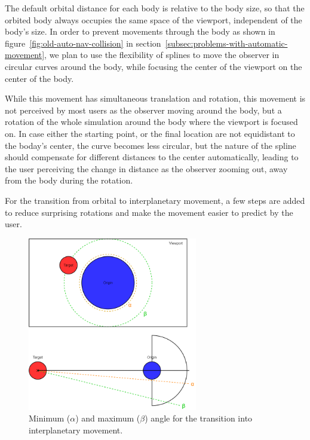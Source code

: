 The default orbital distance for each body is relative to the body size, so that the orbited body always occupies the
same space of the viewport, independent of the body's size.
In order to prevent movements through the body as shown in figure~\ref{fig:old-auto-nav-collision} in
section~\ref{subsec:problems-with-automatic-movement}, we plan to use the flexibility of splines to move the observer
in circular curves around the body, while focusing the center of the viewport on the center of the body.

While this movement has simultaneous translation and rotation, this movement is not perceived by most users as the
observer moving around the body, but a rotation of the whole simulation around the body where the viewport is focused
on.
In case either the starting point, or the final location are not equidistant to the boday's center, the curve becomes
less circular, but the nature of the spline should compensate for different distances to the center automatically,
leading to the user perceiving the change in distance as the observer zooming out, away from the body during the
rotation.

For the transition from orbital to interplanetary movement, a few steps are added to reduce surprising rotations and
make the movement easier to predict by the user.

\begin{figure}[h]
    \centering
    \includegraphics[width=0.66\textwidth]{content/4_3_autoNavigation/img/OrbitTransitionAngles}
    \caption{Minimum ($\alpha$) and maximum ($\beta$) angle for the transition into interplanetary movement.}
    \label{fig:orbital-transition-angles}
\end{figure}

